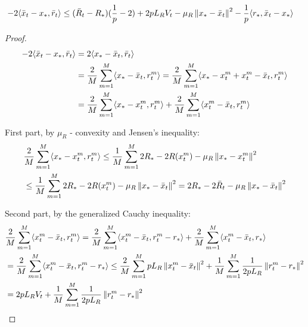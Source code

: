 \begin{lemma} \label{lem:inner_2}
\begin{align}
    \begin{split}
    - 2 \inner{\bar{x}_t - x_*}{\bar{r}_t} 
    &\leq 
    (\bar{R}_t - R_*)(\frac{1}{p} - 2) + 2 p L_R V_t - \mu_R \norm{x_* - \bar{x}_t}^2 
     - \frac{1}{p}\inner{r_*}{\bar{x}_t - x_*}
    \end{split}
\end{align}
\end{lemma}
\begin{proof}
    \begin{align}
        - 2 \inner{\bar{x}_t - x_*}{\bar{r}_t} &= 2 \inner{x_* - \bar{x}_t} {\bar{r}_t} \\
        &= \frac{2}{M} \summ{m=1}{M}{ \inner{x_* - \bar{x}_t}{r^m_t} } 
        = \frac{2}{M} \summ{m=1}{M}{\inner{x_* - x^m_t + x^m_t - \bar{x}_t}{r^m_t}} \\
        &= \frac{2}{M} \summ{m=1}{M}{\inner{x_* - x^m_t}{r^m_t}} 
        + \frac{2}{M} \summ{m=1}{M}{\inner{x^m_t - \bar{x}_t}{r^m_t}} \label{eq:St_3_0}
    \end{align}
    
    First part, by $\mu_R$ - convexity and Jensen's inequality:
    \begin{align}
        &\frac{2}{M} \summ{m=1}{M}{\inner{x_* - x^m_t}{r^m_t}} 
        \leq \frac{1}{M} \summ{m=1}{M}{2 R_* - 2 R(x^m_t) - \mu_R \norm{x_* - x^m_t}^2} \\
        &\leq \frac{1}{M} \summ{m=1}{M}{2 R_* - 2 R(x^m_t) - \mu_R \norm{x_* - \bar{x}_t}^2} 
        = 2 R_* - 2 \bar{R}_t - \mu_R \norm{x_* - \bar{x}_t}^2 \label{eq:St_3_1}
    \end{align}
    
    Second part, by the generalized Cauchy inequality:
    \begin{align}
        &\frac{2}{M} \summ{m=1}{M}{\inner{x^m_t - \bar{x}_t}{r^m_t}}
        = \frac{2}{M} \summ{m=1}{M}{\inner{x^m_t - \bar{x}_t}{r^m_t - r_*}} 
        + \frac{2}{M} \summ{m=1}{M}{\inner{x^m_t - \bar{x}_t}{r_*}} \\
        &= 
        \frac{2}{M} \summ{m=1}{M}{\inner{x^m_t - \bar{x}_t}{r^m_t - r_*}} 
        \leq \frac{2}{M} \summ{m=1}{M}{p L_R \norm{x^m_t - \bar{x}_t}^2 }
        + \frac{1}{M} \summ{m=1}{M}{\frac{1}{2 p L_R} \norm{r^m_t-r_*}^2 } \\
        &= 
        2 p L_R V_t 
        + \frac{1}{M} \summ{m=1}{M}{\frac{1}{2 p L_R} \norm{r^m_t-r_*}^2 } \label{eq:St_3_2_1}
    \end{align}
    

\end{proof}
